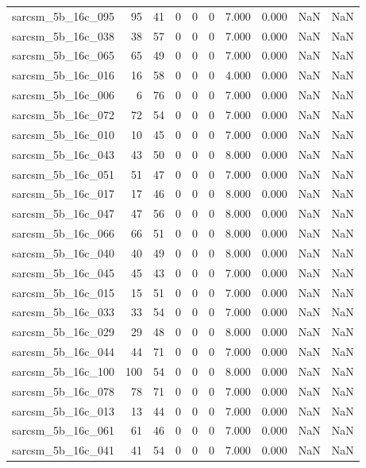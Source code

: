 \documentclass{article}
\begin{document}
\begin{longtable}{lrrrrrrrrr}
sarcsm\_5b\_16c\_095 & 95 & 41 & 0 & 0 & 0 & 7.000 & 0.000 & NaN & NaN \\
sarcsm\_5b\_16c\_038 & 38 & 57 & 0 & 0 & 0 & 7.000 & 0.000 & NaN & NaN \\
sarcsm\_5b\_16c\_065 & 65 & 49 & 0 & 0 & 0 & 7.000 & 0.000 & NaN & NaN \\
sarcsm\_5b\_16c\_016 & 16 & 58 & 0 & 0 & 0 & 4.000 & 0.000 & NaN & NaN \\
sarcsm\_5b\_16c\_006 & 6 & 76 & 0 & 0 & 0 & 7.000 & 0.000 & NaN & NaN \\
sarcsm\_5b\_16c\_072 & 72 & 54 & 0 & 0 & 0 & 7.000 & 0.000 & NaN & NaN \\
sarcsm\_5b\_16c\_010 & 10 & 45 & 0 & 0 & 0 & 7.000 & 0.000 & NaN & NaN \\
sarcsm\_5b\_16c\_043 & 43 & 50 & 0 & 0 & 0 & 8.000 & 0.000 & NaN & NaN \\
sarcsm\_5b\_16c\_051 & 51 & 47 & 0 & 0 & 0 & 7.000 & 0.000 & NaN & NaN \\
sarcsm\_5b\_16c\_017 & 17 & 46 & 0 & 0 & 0 & 8.000 & 0.000 & NaN & NaN \\
sarcsm\_5b\_16c\_047 & 47 & 56 & 0 & 0 & 0 & 8.000 & 0.000 & NaN & NaN \\
sarcsm\_5b\_16c\_066 & 66 & 51 & 0 & 0 & 0 & 8.000 & 0.000 & NaN & NaN \\
sarcsm\_5b\_16c\_040 & 40 & 49 & 0 & 0 & 0 & 8.000 & 0.000 & NaN & NaN \\
sarcsm\_5b\_16c\_045 & 45 & 43 & 0 & 0 & 0 & 7.000 & 0.000 & NaN & NaN \\
sarcsm\_5b\_16c\_015 & 15 & 51 & 0 & 0 & 0 & 7.000 & 0.000 & NaN & NaN \\
sarcsm\_5b\_16c\_033 & 33 & 54 & 0 & 0 & 0 & 7.000 & 0.000 & NaN & NaN \\
sarcsm\_5b\_16c\_029 & 29 & 48 & 0 & 0 & 0 & 8.000 & 0.000 & NaN & NaN \\
sarcsm\_5b\_16c\_044 & 44 & 71 & 0 & 0 & 0 & 7.000 & 0.000 & NaN & NaN \\
sarcsm\_5b\_16c\_100 & 100 & 54 & 0 & 0 & 0 & 8.000 & 0.000 & NaN & NaN \\
sarcsm\_5b\_16c\_078 & 78 & 71 & 0 & 0 & 0 & 7.000 & 0.000 & NaN & NaN \\
sarcsm\_5b\_16c\_013 & 13 & 44 & 0 & 0 & 0 & 7.000 & 0.000 & NaN & NaN \\
sarcsm\_5b\_16c\_061 & 61 & 46 & 0 & 0 & 0 & 7.000 & 0.000 & NaN & NaN \\
sarcsm\_5b\_16c\_041 & 41 & 54 & 0 & 0 & 0 & 7.000 & 0.000 & NaN & NaN \\

\end{longtable}
\end{document}
